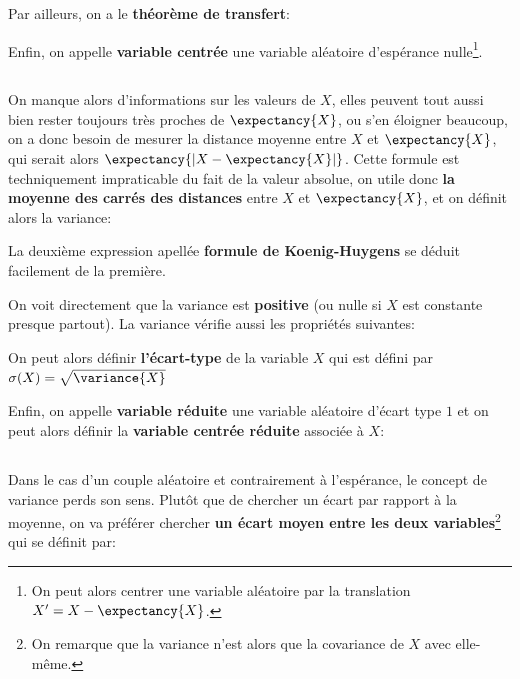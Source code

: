 Par ailleurs, on a le \textbf{théorème de transfert}:

Enfin, on appelle \textbf{variable centrée} une variable aléatoire d'espérance nulle\footnote[2]{On peut alors centrer une variable aléatoire par la translation \(X' = X - \expectancy{X}\).}.

\subsection*{}
On manque alors d'informations sur les valeurs de \(X\), elles peuvent tout aussi bien rester toujours très
proches de \(\expectancy{X}\), ou s'en éloigner beaucoup, on a donc besoin de mesurer la distance moyenne entre \(X\) et \(\expectancy{X}\), qui serait alors \(\expectancy{| X - \expectancy{X} |}\).\+
Cette formule est techniquement impraticable du fait de la valeur absolue, on utile donc \textbf{la moyenne des carrés des distances} entre \(X\) et \(\expectancy{X}\), et on définit alors la variance:

La deuxième expression apellée \textbf{formule de Koenig-Huygens} se déduit facilement de la première.
\pagebreak

On voit directement que la variance est \textbf{positive} (ou nulle si \(X\) est constante presque partout). \+
La variance vérifie aussi les propriétés suivantes:

On peut alors définir \textbf{l'écart-type} de la variable \(X\) qui est défini par \(\sigma(X) = \sqrt{\variance{X}}\)\<

Enfin, on appelle \textbf{variable réduite} une variable aléatoire d'écart type \(1\) et on peut alors définir la \textbf{variable centrée réduite} associée à \(X\):


\subsection*{}
Dans le cas d'un couple aléatoire et contrairement à l'espérance, le concept de variance perds son sens. Plutôt que de chercher un écart par rapport à la moyenne, on va préférer chercher \textbf{un écart moyen entre les deux variables}\footnote[1]{On remarque que la variance n'est alors que la covariance de \(X\) avec elle-même.} qui se définit par:

